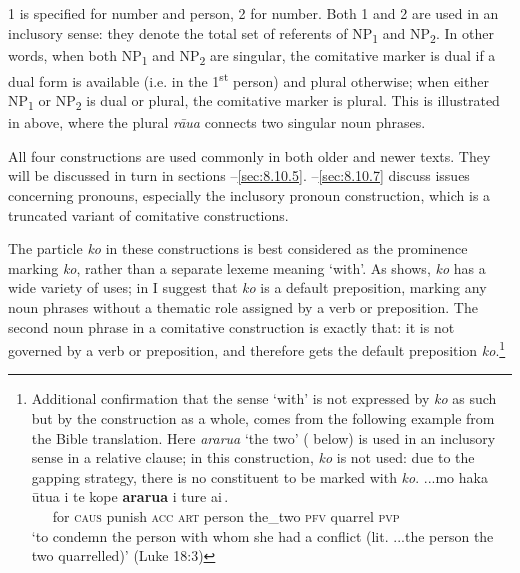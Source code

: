 1 is specified for number and person, 2 for number. Both 1 and 2 are used in an inclusory sense: they denote the total set of referents of NP\textsubscript{1} and NP\textsubscript{2}. In other words, when both NP\textsubscript{1} and NP\textsubscript{2} are singular, the comitative marker is dual if a dual form is available (i.e. in the 1\textsuperscript{st} person) and plural otherwise; when either NP\textsubscript{1} or NP\textsubscript{2} is dual or plural, the comitative marker is plural. This is illustrated in  above, where the plural \textit{rāua} connects two singular noun phrases.

All four constructions are used commonly in both older and newer texts. They will be discussed in turn in sections –\ref{sec:8.10.5}. –\ref{sec:8.10.7} discuss issues concerning pronouns, especially the inclusory pronoun construction, which is a truncated variant of comitative constructions.

The particle \textit{ko} in these constructions is best considered as the prominence marking \textit{ko}, rather than a separate lexeme meaning ‘with’. As  shows, \textit{ko} has a wide variety of uses; in  I suggest that \textit{ko} is a default preposition, marking any noun phrases without a thematic role assigned by a verb or preposition. The second noun phrase in a comitative construction is exactly that: it is not governed by a verb or preposition, and therefore gets the default preposition \textit{ko}.\footnote{\label{fn:447}Additional confirmation that the sense ‘with’ is not expressed by \textit{ko} as such but by the construction as a whole, comes from the following example from the Bible translation. Here \textit{ararua} ‘the two’ ( below) is used in an inclusory sense in a relative clause; in this construction, \textit{ko} is not used: due to the gapping strategy, there is no constituent to be marked with \textit{ko}. 
\ea
\gll  
...mo haka ūtu{\ꞌ}a i te kope {\ob}\textbf{ararua} i ture ai\,{\cb}.\\
  ~~~for \textsc{caus} punish \textsc{acc} \textsc{art} person {\db}the\_two \textsc{pfv} quarrel \textsc{pvp}\\
\glt   
‘to condemn the person with whom she had a conflict (lit. ...the person the two quarrelled)’ (Luke 18:3)
\z
} 

